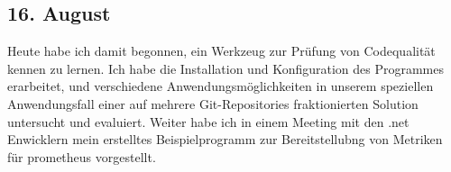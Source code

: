 \subsection{16. August}
Heute habe ich damit begonnen, ein Werkzeug zur Prüfung von Codequalität kennen zu lernen. Ich habe die Installation und Konfiguration des Programmes erarbeitet, und verschiedene Anwendungsmöglichkeiten in unserem speziellen Anwendungsfall einer auf mehrere Git-Repositories fraktionierten Solution untersucht und evaluiert. Weiter habe ich in einem Meeting mit den .net Enwicklern mein erstelltes Beispielprogramm zur Bereitstellubng von Metriken für prometheus vorgestellt.